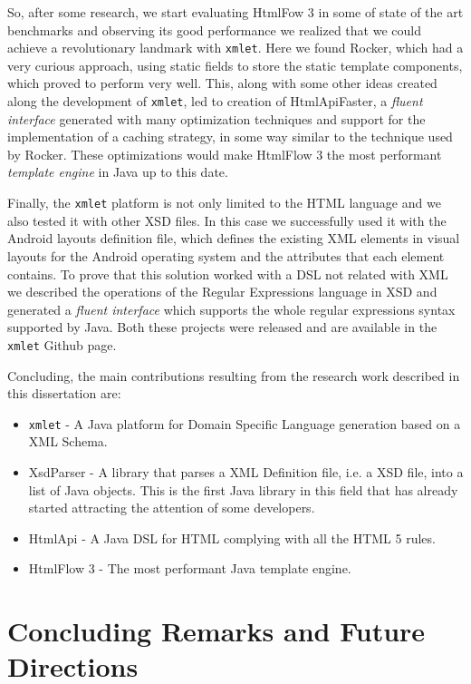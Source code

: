 \noindent
So, after some research, we start evaluating HtmlFow 3 in some of state of the art benchmarks and observing its good performance we realized that we could achieve a revolutionary landmark with \texttt{xmlet}. Here we found Rocker, which had a very curious approach, using static fields to store the static template components, which proved to perform very well. This, along with some other ideas created along the development of \texttt{xmlet}, led to creation of HtmlApiFaster, a \textit{fluent interface} generated with many optimization techniques and support for the implementation of a caching strategy, in some way similar to the technique used by Rocker. These optimizations would make HtmlFlow 3 the most performant \textit{template engine} in Java up to this date.

\noindent
Finally, the \texttt{xmlet} platform is not only limited to the \ac{HTML} language and we also tested it with other \ac{XSD} files. In this case we successfully used it with the Android layouts definition file, which defines the existing \ac{XML} elements in visual layouts for the Android operating system and the attributes that each element contains. To prove that this solution worked with a \ac{DSL} not related with \ac{XML} we described the operations of the Regular Expressions language in \ac{XSD} and generated a \textit{fluent interface} which supports the whole regular expressions syntax supported by Java. Both these projects were released and are available in the \texttt{xmlet} Github page.

\noindent
Concluding, the main contributions resulting from the research work described in this dissertation are: 

\begin{itemize}
	\item \texttt{xmlet} - A Java platform for Domain Specific Language generation based on a XML Schema.
	\item XsdParser - A library that parses a \ac{XML} Definition file, i.e. a \ac{XSD} file, into a list of Java objects. This is the first Java library in this field that has already started attracting the attention of some developers.
	\item HtmlApi - A Java \ac{DSL} for \ac{HTML} complying with all the \ac{HTML} 5 rules.
	\item HtmlFlow 3 - The most performant Java template engine.
\end{itemize}

\section{Concluding Remarks and Future Directions}
\label{cha:concludingremarks}

